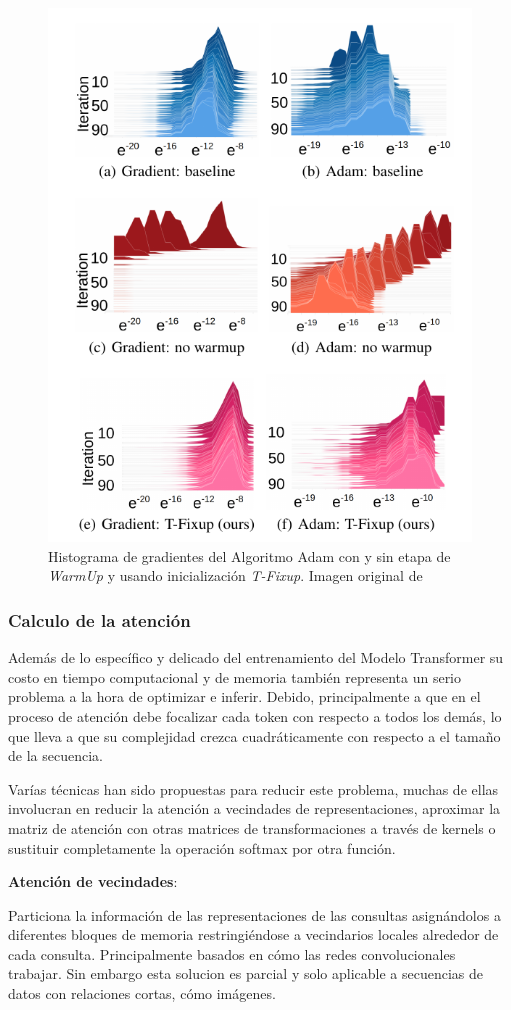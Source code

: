 \begin{figure}[ht!]
    \centering
    \includegraphics[width=0.5 \textwidth]{Chapters/1. Transformer/Figures/transformer/tfixup.png}
    \caption{Histograma de gradientes del Algoritmo Adam con y sin etapa de \textit{WarmUp} y
    usando inicialización \textit{T-Fixup}. Imagen original de \citeauthor{pmlr-v119-huang20f}}
    \label{fig:t-fixup}
\end{figure}

\subsubsection{Calculo de la atención}

Además de lo específico y delicado del entrenamiento del Modelo Transformer su costo en tiempo
computacional y de memoria también representa un serio problema a la hora de optimizar e inferir.
Debido, principalmente a que en el proceso de atención debe focalizar cada token con respecto a todos
los demás, lo que lleva a que su complejidad crezca cuadráticamente con respecto a el tamaño de la
secuencia.

Varías técnicas han sido propuestas para reducir este problema, muchas de ellas involucran en reducir
la atención a vecindades de representaciones, aproximar la matriz de atención con otras matrices de
transformaciones a través de kernels o sustituir completamente la operación softmax por otra función.

\textbf{Atención de vecindades}:

\citeauthor*{DBLP:journals/corr/abs-1802-05751} Particiona la información de las representaciones de
las consultas asignándolos a diferentes bloques de memoria restringiéndose a vecindarios locales
alrededor de cada consulta. Principalmente basados en cómo las redes convolucionales trabajar. Sin
embargo esta solucion es parcial y solo aplicable a secuencias de datos con relaciones cortas, cómo
imágenes.

